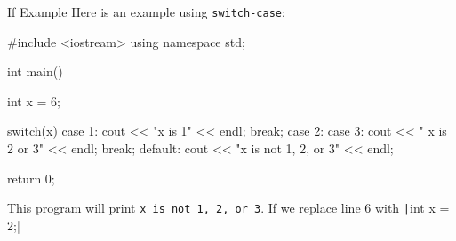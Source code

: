 \documentclass[../lecture3-flowofcontrol.tex]{subfiles}
\begin{document}
\begin{frame}[fragile]{If Example}
    Here is an example using \verb|switch-case|:
\begin{cppcode}[]
#include <iostream>
using namespace std;

int main()
{
    int x = 6;

    switch(x)
    {
        case 1:
            cout << "x is 1" << endl;
            break;
        case 2:
        case 3:
            cout << " x is 2 or 3" << endl;
            break;
        default:
            cout << "x is not 1, 2, or 3" << endl;
    }

    return 0;
}
\end{cppcode}

    This program will print \verb|x is not 1, 2, or 3|. If we replace line 6 with \texttt|int x = 2;|
\end{frame}

\end{document}

